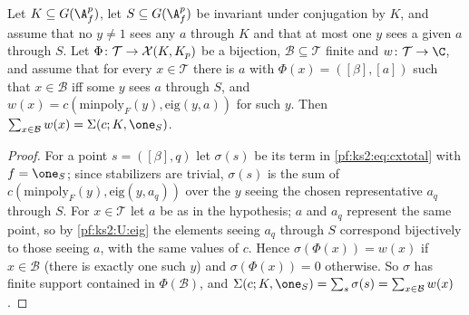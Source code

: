 \begin{lemma}\label{pf:ks2:sumpts}
Let $K\subseteq\kstwoG$, let $S\subseteq\kstwoG$ be invariant under conjugation by $K$, and assume that
no $y\ne1$ sees any $a$ through $K$ and that at most one $y$ sees a given $a$ through $S$. Let
$\Phi\colon\mathcal T\to\mathcal{X}(K,K_{p})$ be a bijection, $\mathcal B\subseteq\mathcal T$ finite
and $w\colon\mathcal T\to\C$, and assume that for every $x\in\mathcal T$ there is $a$ with
$\Phi(x)=([\beta],[a])$ such that $x\in\mathcal B$ iff some $y$ sees $a$ through $S$, and
$w(x)=c(\mathrm{minpoly}_F(y),\mathrm{eig}(y,a))$ for such $y$. Then
$\sum_{x\in\mathcal B}w(x)=\Sigma(c;K,\one_S)$.
\end{lemma}

\begin{proof}
For a point $s=([\beta],q)$ let $\sigma(s)$ be its term in
\eqref{pf:ks2:eq:cxtotal} with $f=\one_S$; since stabilizers are trivial, $\sigma(s)$ is the sum of
$c(\mathrm{minpoly}_F(y),\mathrm{eig}(y,a_q))$ over the $y$ seeing the chosen representative $a_q$
through $S$. For $x\in\mathcal T$ let $a$ be as in the hypothesis; $a$ and $a_q$ represent the same
point, so by \ref{pf:ks2:U:eig} the elements seeing $a_q$ through $S$ correspond bijectively to those
seeing $a$, with the same values of $c$. Hence $\sigma(\Phi(x))=w(x)$ if $x\in\mathcal B$ (there is
exactly one such $y$) and $\sigma(\Phi(x))=0$ otherwise. So $\sigma$ has finite support contained in
$\Phi(\mathcal B)$, and $\Sigma(c;K,\one_S)=\sum_s\sigma(s)=\sum_{x\in\mathcal B}w(x)$.
\end{proof}

